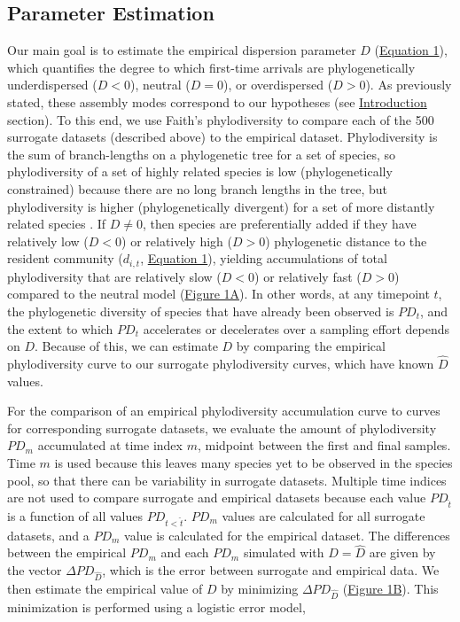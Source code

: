 \documentclass{article}
\begin{document}
\subsection{Parameter Estimation} \label{sec:parameterEstimation}
Our main goal is to estimate the empirical dispersion parameter \(D\) (\hyperref[sec:equation1]{Equation 1}), which quantifies the degree to which first-time arrivals are phylogenetically underdispersed (\(D<0\)), neutral (\(D=0\)), or overdispersed (\(D>0\)). As previously stated, these assembly modes correspond to our hypotheses (see \hyperref[sec:introduction]{Introduction} section). To this end, we use Faith's phylodiversity \cite{Faith1992} to compare each of the 500 surrogate datasets (described above) to the empirical dataset. Phylodiversity is the sum of branch-lengths on a phylogenetic tree for a set of species, so phylodiversity of a set of highly related species is low (phylogenetically constrained) because there are no long branch lengths in the tree, but phylodiversity is higher (phylogenetically divergent) for a set of more distantly related species \cite{Faith1992}. If \(D\neq0\), then species are preferentially added if they have relatively low (\(D<0\)) or relatively high (\(D>0\)) phylogenetic distance to the resident community (\(d_{i,t}\), \hyperref[sec:equation1]{Equation 1}), yielding accumulations of total phylodiversity that are relatively slow (\(D<0\)) or relatively fast (\(D>0\)) compared to the neutral model (\hyperref[sec:figure1]{Figure 1A}). In other words, at any timepoint \(t\), the phylogenetic diversity of species that have already been observed is \(PD_t\), and the extent to which \(PD_t\) accelerates or decelerates over a sampling effort depends on \(D\). Because of this, we can estimate \(D\) by comparing the empirical phylodiversity curve to our surrogate phylodiversity curves, which have known \(\hat{D}\) values.
 \par
For the comparison of an empirical phylodiversity accumulation curve to curves for corresponding surrogate datasets, we evaluate the amount of phylodiversity \(PD_m\) accumulated at time index \(m\), midpoint between the first and final samples. Time \(m\) is used because this leaves many species yet to be observed in the species pool, so that there can be variability in surrogate datasets. Multiple time indices are not used to compare surrogate and empirical datasets because each value \(PD_{\hat{t}}\) is a function of all values \(PD_{t<\hat{t}}\). \(PD_m\) values are calculated for all surrogate datasets, and a \(PD_m\) value is calculated for the empirical dataset. The differences between the empirical \(PD_m\) and each \(PD_m\) simulated with \(D=\hat{D}\) are given by the vector \(\Delta PD_{\hat{D}}\), which is the error between surrogate and empirical data. We then estimate the empirical value of \(D\) by minimizing \(\Delta PD_{\hat{D}}\) (\hyperref[sec:figure1]{Figure 1B}). This minimization is performed using a logistic error model,
\end{document}
